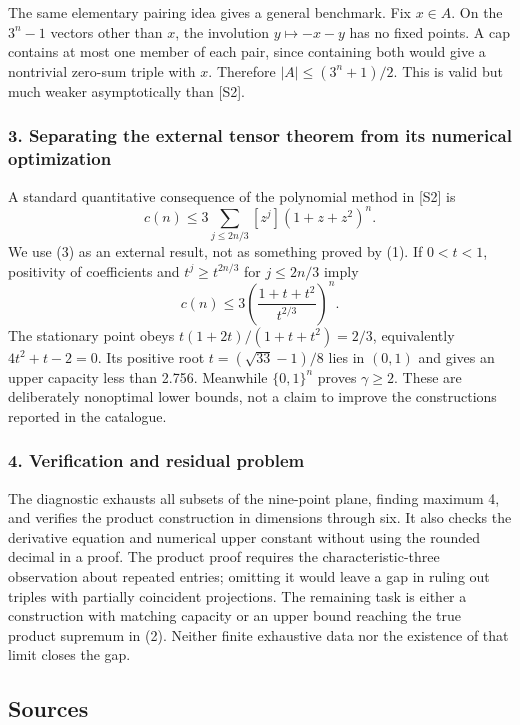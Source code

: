 \documentclass[11pt,a4paper]{article}
\begin{document}
The same elementary pairing idea gives a general benchmark. Fix $x\in A$. On the $3^n-1$ vectors other than $x$, the involution $y\mapsto -x-y$ has no fixed points. A cap contains at most one member of each pair, since containing both would give a nontrivial zero-sum triple with $x$. Therefore $|A|\leq(3^n+1)/2$. This is valid but much weaker asymptotically than [S2].

\subsubsection{3. Separating the external tensor theorem from its numerical optimization}
A standard quantitative consequence of the polynomial method in [S2] is
\[c(n)\leq3\sum_{j\leq2n/3}[z^j](1+z+z^2)^n.\tag{3}\]
We use (3) as an external result, not as something proved by (1). If $0<t<1$, positivity of coefficients and $t^j\geq t^{2n/3}$ for $j\leq2n/3$ imply
\[c(n)\leq3\left(\frac{1+t+t^2}{t^{2/3}}\right)^n.\]
The stationary point obeys $t(1+2t)/(1+t+t^2)=2/3$, equivalently $4t^2+t-2=0$. Its positive root $t=(\sqrt{33}-1)/8$ lies in $(0,1)$ and gives an upper capacity less than 2.756. Meanwhile $\{0,1\}^n$ proves $\gamma\geq2$. These are deliberately nonoptimal lower bounds, not a claim to improve the constructions reported in the catalogue.

\subsubsection{4. Verification and residual problem}
The diagnostic exhausts all subsets of the nine-point plane, finding maximum 4, and verifies the product construction in dimensions through six. It also checks the derivative equation and numerical upper constant without using the rounded decimal in a proof. The product proof requires the characteristic-three observation about repeated entries; omitting it would leave a gap in ruling out triples with partially coincident projections. The remaining task is either a construction with matching capacity or an upper bound reaching the true product supremum in (2). Neither finite exhaustive data nor the existence of that limit closes the gap.

\subsection{Sources}
\end{document}
